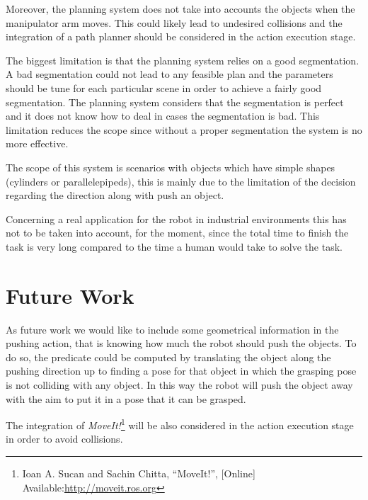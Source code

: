 Moreover, the planning system does not take into accounts the objects when the manipulator arm moves. This could likely lead to undesired collisions and the integration of a  path planner should be considered in the action execution stage.  

The biggest limitation is that the planning system relies on a good segmentation. A bad segmentation could not lead to any feasible plan and the parameters should be tune for each particular scene in order to achieve a fairly good segmentation. The planning system considers that the segmentation  is perfect and it does not know how to deal in cases the segmentation is bad. This limitation reduces the scope since without a proper segmentation the system is no more effective. 

The scope of this system  is  scenarios with objects which have simple shapes (cylinders or parallelepipeds), this is mainly due to the limitation of the decision regarding the direction along with push an object.  

Concerning a real application for the robot in industrial environments this has not to be taken into account, for the moment, since the total time to finish the task is very long compared to the time a human would take to solve the task.

\section*{Future Work}
As future work we would like to include some geometrical information in the pushing action, that is knowing how much the robot should push the objects. To do so, the  predicate could be computed by translating the object along the pushing direction up to finding a pose for that object in which the grasping pose is not colliding with any object. In this way the robot will push the object away with the aim to put it in a pose that it can be grasped.

The integration of \textit{MoveIt!}\footnote{Ioan A. Sucan and Sachin Chitta, “MoveIt!”, [Online] Available:\href{http://moveit.ros.org} {\url{http://moveit.ros.org}}} will be also considered in the action execution stage in order to avoid  collisions. 

